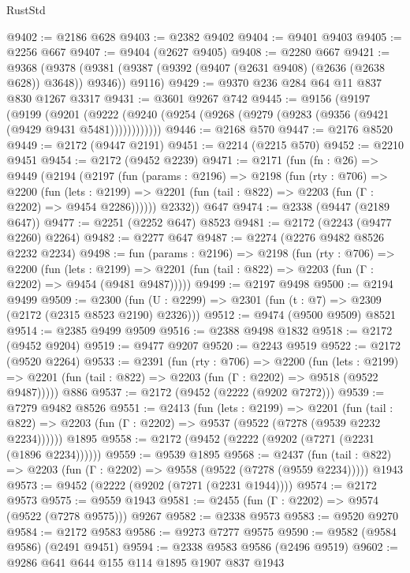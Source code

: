 \begin{lexlean}{RustStd}
\begin{coremodule}
@9402 := @2186 @628
@9403 := @2382 @9402
@9404 := @9401 @9403
@9405 := @2256 @667
@9407 := @9404 (@2627 @9405)
@9408 := @2280 @667
@9421 := @9368
    (@9378 (@9381 (@9387 (@9392 (@9407 (@2631 @9408) (@2636 (@2638 @628)) @3648)) @9346)) @9116)
@9429 := @9370 @236 @284 @64 @11 @837 @830 @1267 @3317
@9431 := @3601 @9267 @742
@9445 := @9156
    (@9197
      (@9199
        (@9201
          (@9222 (@9240 (@9254 (@9268 (@9279 (@9283 (@9356 (@9421 (@9429 @9431 @5481))))))))))))
@9446 := @2168 @570
@9447 := @2176 @8520
@9449 := @2172 (@9447 @2191)
@9451 := @2214 (@2215 @570)
@9452 := @2210 @9451
@9454 := @2172 (@9452 @2239)
@9471 := @2171
    (fun (fn : @26) =>
    @9449
      (@2194
        (@2197
          (fun (params : @2196) =>
          @2198
            (fun (rty : @706) =>
            @2200
              (fun (lets : @2199) =>
              @2201 (fun (tail : @822) => @2203 (fun (Γ : @2202) => @9454 @2286))))))
        @2332))
    @647
@9474 := @2338 (@9447 (@2189 @647))
@9477 := @2251 (@2252 @647) @8523
@9481 := @2172 (@2243 (@9477 @2260) @2264)
@9482 := @2277 @647
@9487 := @2274 (@2276 @9482 @8526 @2232 @2234)
@9498 := fun (params : @2196) =>
  @2198
    (fun (rty : @706) =>
    @2200
      (fun (lets : @2199) =>
      @2201 (fun (tail : @822) => @2203 (fun (Γ : @2202) => @9454 (@9481 @9487)))))
@9499 := @2197 @9498
@9500 := @2194 @9499
@9509 := @2300 (fun (U : @2299) => @2301 (fun (t : @7) => @2309 (@2172 (@2315 @8523 @2190) @2326)))
@9512 := @9474 (@9500 @9509) @8521
@9514 := @2385 @9499 @9509
@9516 := @2388 @9498 @1832
@9518 := @2172 (@9452 @9204)
@9519 := @9477 @9207
@9520 := @2243 @9519
@9522 := @2172 (@9520 @2264)
@9533 := @2391
    (fun (rty : @706) =>
    @2200
      (fun (lets : @2199) =>
      @2201 (fun (tail : @822) => @2203 (fun (Γ : @2202) => @9518 (@9522 @9487)))))
    @886
@9537 := @2172 (@9452 (@2222 (@9202 @7272)))
@9539 := @7279 @9482 @8526
@9551 := @2413
    (fun (lets : @2199) =>
    @2201
      (fun (tail : @822) => @2203 (fun (Γ : @2202) => @9537 (@9522 (@7278 (@9539 @2232 @2234))))))
    @1895
@9558 := @2172 (@9452 (@2222 (@9202 (@7271 (@2231 (@1896 @2234))))))
@9559 := @9539 @1895
@9568 := @2437
    (fun (tail : @822) => @2203 (fun (Γ : @2202) => @9558 (@9522 (@7278 (@9559 @2234)))))
    @1943
@9573 := @9452 (@2222 (@9202 (@7271 (@2231 @1944))))
@9574 := @2172 @9573
@9575 := @9559 @1943
@9581 := @2455 (fun (Γ : @2202) => @9574 (@9522 (@7278 @9575))) @9267
@9582 := @2338 @9573
@9583 := @9520 @9270
@9584 := @2172 @9583
@9586 := @9273 @7277 @9575
@9590 := @9582 (@9584 @9586) (@2491 @9451)
@9594 := @2338 @9583 @9586 (@2496 @9519)
@9602 := @9286 @641 @644 @155 @114 @1895 @1907 @837 @1943

\end{coremodule}
\end{lexlean}
